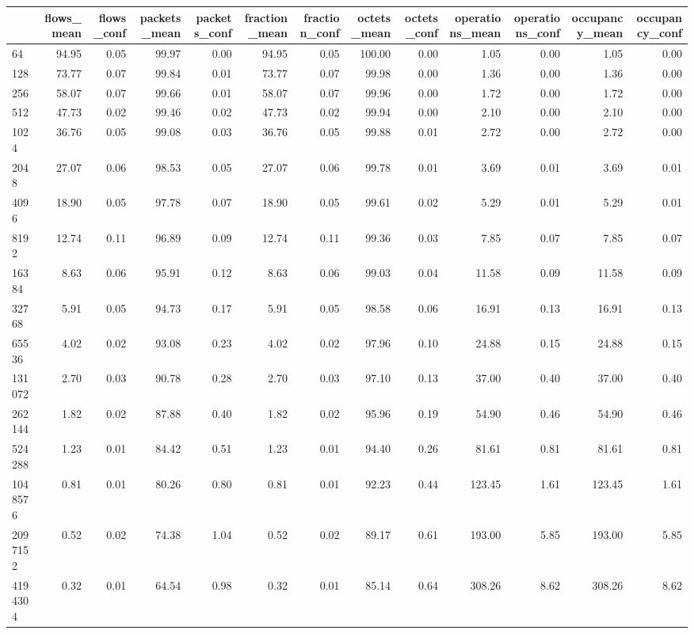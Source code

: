 \begin{tabular}{lrrrrrrrrrrrr}
\toprule
 & flows_mean & flows_conf & packets_mean & packets_conf & fraction_mean & fraction_conf & octets_mean & octets_conf & operations_mean & operations_conf & occupancy_mean & occupancy_conf \\
\midrule
64 & 94.95 & 0.05 & 99.97 & 0.00 & 94.95 & 0.05 & 100.00 & 0.00 & 1.05 & 0.00 & 1.05 & 0.00 \\
128 & 73.77 & 0.07 & 99.84 & 0.01 & 73.77 & 0.07 & 99.98 & 0.00 & 1.36 & 0.00 & 1.36 & 0.00 \\
256 & 58.07 & 0.07 & 99.66 & 0.01 & 58.07 & 0.07 & 99.96 & 0.00 & 1.72 & 0.00 & 1.72 & 0.00 \\
512 & 47.73 & 0.02 & 99.46 & 0.02 & 47.73 & 0.02 & 99.94 & 0.00 & 2.10 & 0.00 & 2.10 & 0.00 \\
1024 & 36.76 & 0.05 & 99.08 & 0.03 & 36.76 & 0.05 & 99.88 & 0.01 & 2.72 & 0.00 & 2.72 & 0.00 \\
2048 & 27.07 & 0.06 & 98.53 & 0.05 & 27.07 & 0.06 & 99.78 & 0.01 & 3.69 & 0.01 & 3.69 & 0.01 \\
4096 & 18.90 & 0.05 & 97.78 & 0.07 & 18.90 & 0.05 & 99.61 & 0.02 & 5.29 & 0.01 & 5.29 & 0.01 \\
8192 & 12.74 & 0.11 & 96.89 & 0.09 & 12.74 & 0.11 & 99.36 & 0.03 & 7.85 & 0.07 & 7.85 & 0.07 \\
16384 & 8.63 & 0.06 & 95.91 & 0.12 & 8.63 & 0.06 & 99.03 & 0.04 & 11.58 & 0.09 & 11.58 & 0.09 \\
32768 & 5.91 & 0.05 & 94.73 & 0.17 & 5.91 & 0.05 & 98.58 & 0.06 & 16.91 & 0.13 & 16.91 & 0.13 \\
65536 & 4.02 & 0.02 & 93.08 & 0.23 & 4.02 & 0.02 & 97.96 & 0.10 & 24.88 & 0.15 & 24.88 & 0.15 \\
131072 & 2.70 & 0.03 & 90.78 & 0.28 & 2.70 & 0.03 & 97.10 & 0.13 & 37.00 & 0.40 & 37.00 & 0.40 \\
262144 & 1.82 & 0.02 & 87.88 & 0.40 & 1.82 & 0.02 & 95.96 & 0.19 & 54.90 & 0.46 & 54.90 & 0.46 \\
524288 & 1.23 & 0.01 & 84.42 & 0.51 & 1.23 & 0.01 & 94.40 & 0.26 & 81.61 & 0.81 & 81.61 & 0.81 \\
1048576 & 0.81 & 0.01 & 80.26 & 0.80 & 0.81 & 0.01 & 92.23 & 0.44 & 123.45 & 1.61 & 123.45 & 1.61 \\
2097152 & 0.52 & 0.02 & 74.38 & 1.04 & 0.52 & 0.02 & 89.17 & 0.61 & 193.00 & 5.85 & 193.00 & 5.85 \\
4194304 & 0.32 & 0.01 & 64.54 & 0.98 & 0.32 & 0.01 & 85.14 & 0.64 & 308.26 & 8.62 & 308.26 & 8.62 \\

\end{tabular}
